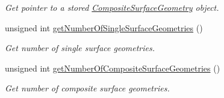 \begin{DoxyCompactItemize}
\begin{DoxyCompactList}\small\item\em Get pointer to a stored \hyperlink{classtudat_1_1geometric__shapes_1_1CompositeSurfaceGeometry}{Composite\+Surface\+Geometry} object. \end{DoxyCompactList}\item 
unsigned int \hyperlink{classtudat_1_1geometric__shapes_1_1CompositeSurfaceGeometry_a16f33cf68b86a0613d73d5786f4ee35f}{get\+Number\+Of\+Single\+Surface\+Geometries} ()
\begin{DoxyCompactList}\small\item\em Get number of single surface geometries. \end{DoxyCompactList}\item 
unsigned int \hyperlink{classtudat_1_1geometric__shapes_1_1CompositeSurfaceGeometry_a1ccb2cfbd1663085eef8d68e61b91277}{get\+Number\+Of\+Composite\+Surface\+Geometries} ()
\begin{DoxyCompactList}\small\item\em Get number of composite surface geometries. \end{DoxyCompactList}\end{DoxyCompactItemize}
